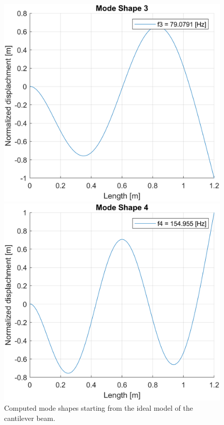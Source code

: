\begin{figure}[H]
\begin{minipage}[b]{0.45\textwidth}
    \end{minipage}
    \begin{minipage}[b]{0.45\textwidth}
        \centering
        \includegraphics[width=\textwidth]{img/MATLAB/Part_A/Mode_shapes/mode_shape_03.png}
    \end{minipage}
    \hfill
    \begin{minipage}[b]{0.45\textwidth}
        \centering
        \includegraphics[width=\textwidth]{img/MATLAB/Part_A/Mode_shapes/mode_shape_04.png}
    \end{minipage}
    \caption{Computed mode shapes starting from the ideal model of the cantilever beam.}
    \label{fig:ideal_mode_shapes}
\end{figure}
